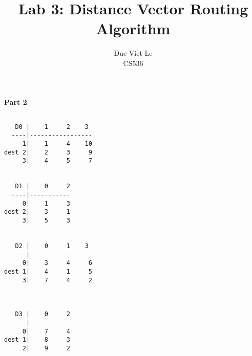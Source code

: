 \documentclass[12pt]{article}
\begin{document}
 
\title{Lab 3:  Distance Vector Routing Algorithm}
\author{Duc Viet Le\\ 
CS536}
\maketitle
\noindent
\large{\textbf{Part 2}}
\normalsize

\begin{Verbatim} 

   D0 |    1     2    3 
  ----|-----------------
     1|    1     4    10
dest 2|    2     3     9
     3|    4     5     7


   D1 |    0     2 
  ----|-----------
     0|    1     3
dest 2|    3     1
     3|    5     3


   D2 |    0     1    3 
  ----|-----------------
     0|    3     4     6
dest 1|    4     1     5
     3|    7     4     2



   D3 |    0     2 
  ----|-----------
     0|    7     4
dest 1|    8     3
     2|    9     2

\end{Verbatim}
\end{document}
